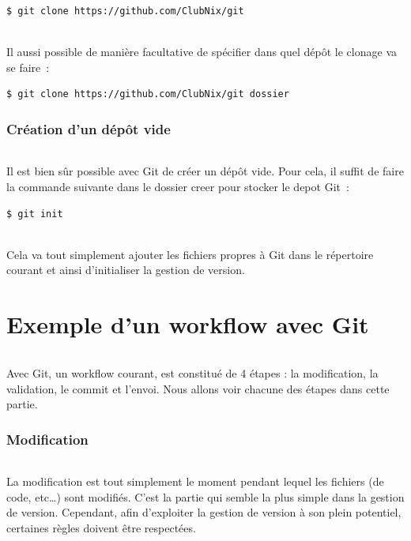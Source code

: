 \documentclass[french, a4paper, 12pt, titlepage]{article}
\begin{document}
\begin{lstlisting}
$ git clone https://github.com/ClubNix/git
\end{lstlisting}
\paragraph{}Il aussi possible de manière facultative de spécifier dans quel dépôt le clonage va se faire~:
\begin{lstlisting}
$ git clone https://github.com/ClubNix/git dossier
\end{lstlisting}

\section{Création d'un dépôt vide}

\paragraph{} Il est bien sûr possible avec Git de créer un dépôt vide. Pour cela, il suffit de faire la commande suivante dans le dossier creer pour stocker le depot Git~:

\begin{lstlisting}
$ git init
\end{lstlisting}

\paragraph{} Cela va tout simplement ajouter les fichiers propres à Git dans le répertoire courant et ainsi d'initialiser la gestion de version.

\part{Exemple d'un workflow avec Git}
\paragraph{} Avec Git, un workflow courant, est constitué de 4 étapes : la modification, la validation, le commit et l'envoi. Nous allons voir chacune des étapes dans cette partie.
\section{Modification}
\paragraph{}La modification est tout simplement le moment pendant lequel les fichiers (de code, etc\dots) sont modifiés. C'est la partie qui semble la plus simple dans la gestion de version. Cependant, afin d'exploiter la gestion de version à son plein potentiel, certaines règles doivent être respectées.
\end{document}
